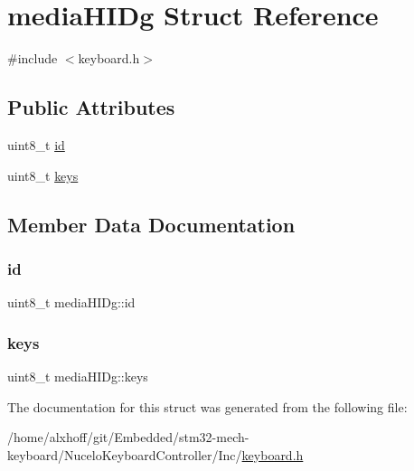 \hypertarget{structmediaHIDg}{}\section{media\+H\+I\+Dg Struct Reference}
\label{structmediaHIDg}


{\ttfamily \#include $<$keyboard.\+h$>$}

\subsection*{Public Attributes}
\begin{DoxyCompactItemize}
\item 
uint8\+\_\+t \hyperlink{structmediaHIDg_afc7a1a22b72e93180dafe48109dd90e6}{id}
\item 
uint8\+\_\+t \hyperlink{structmediaHIDg_a293b11d649aa540df8585613781630f3}{keys}
\end{DoxyCompactItemize}


\subsection{Member Data Documentation}
\mbox{\label{structmediaHIDg_afc7a1a22b72e93180dafe48109dd90e6}} 
\subsubsection{\texorpdfstring{id}{id}}
{\footnotesize\ttfamily uint8\+\_\+t media\+H\+I\+Dg\+::id}

\mbox{\label{structmediaHIDg_a293b11d649aa540df8585613781630f3}} 
\subsubsection{\texorpdfstring{keys}{keys}}
{\footnotesize\ttfamily uint8\+\_\+t media\+H\+I\+Dg\+::keys}



The documentation for this struct was generated from the following file\+:\begin{DoxyCompactItemize}
\item 
/home/alxhoff/git/\+Embedded/stm32-\/mech-\/keyboard/\+Nucelo\+Keyboard\+Controller/\+Inc/\hyperlink{keyboard_8h}{keyboard.\+h}\end{DoxyCompactItemize}
